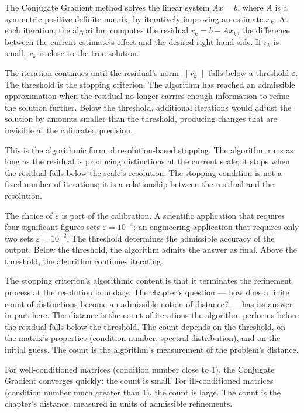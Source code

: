 The Conjugate Gradient method solves the linear system $Ax = b$, where
$A$ is a symmetric positive-definite matrix, by iteratively improving
an estimate $x_k$. At each iteration, the algorithm computes the
residual $r_k = b - A x_k$, the difference between the current
estimate's effect and the desired right-hand side. If $r_k$ is small,
$x_k$ is close to the true solution.

The iteration continues until the residual's norm $\|r_k\|$ falls below
a threshold $\varepsilon$. The threshold is the stopping criterion. The
algorithm has reached an admissible approximation when the residual no
longer carries enough information to refine the solution further. Below
the threshold, additional iterations would adjust the solution by
amounts smaller than the threshold, producing changes that are
invisible at the calibrated precision.

This is the algorithmic form of resolution-based stopping. The
algorithm runs as long as the residual is producing distinctions at
the current scale; it stops when the residual falls below the scale's
resolution. The stopping condition is not a fixed number of iterations;
it is a relationship between the residual and the resolution.

The choice of $\varepsilon$ is part of the calibration. A scientific
application that requires four significant figures sets
$\varepsilon = 10^{-4}$; an engineering application that requires only
two sets $\varepsilon = 10^{-2}$. The threshold determines the
admissible accuracy of the output. Below the threshold, the algorithm
admits the answer as final. Above the threshold, the algorithm
continues iterating.

The stopping criterion's algorithmic content is that it terminates
the refinement process at the resolution boundary. The chapter's
question --- how does a finite count of distinctions become an
admissible notion of distance? --- has its answer in part here. The
distance is the count of iterations the algorithm performs before the
residual falls below the threshold. The count depends on the
threshold, on the matrix's properties (condition number, spectral
distribution), and on the initial guess. The count is the
algorithm's measurement of the problem's distance.

For well-conditioned matrices (condition number close to 1), the
Conjugate Gradient converges quickly: the count is small. For
ill-conditioned matrices (condition number much greater than 1), the
count is large. The count is the chapter's distance, measured in
units of admissible refinements.

